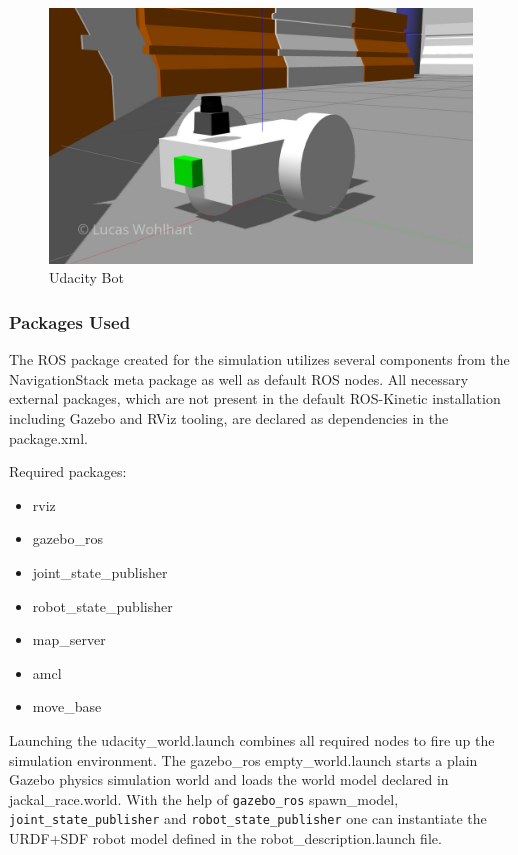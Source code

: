 \documentclass[10pt,journal,compsoc]{IEEEtran}
\begin{document}
\begin{figure}[thpb]
      \centering
      \includegraphics[width=\linewidth]{img/udacity_bot}
      \caption{Udacity Bot}
      \label{fig:udacity_bot}
\end{figure}

\subsubsection{Packages Used}

The ROS package created for the simulation utilizes several components from the NavigationStack meta package as well as default ROS nodes. 
All necessary external packages, which are not present in the default ROS-Kinetic installation including Gazebo and RViz tooling, are declared as dependencies in the package.xml. 

Required packages:
\begin{itemize}
 \item rviz
 \item gazebo\_ros
 \item joint\_state\_publisher
 \item robot\_state\_publisher
 \item map\_server \cite{ROSNavMapServer} 
 \item amcl \cite{ROSNavAMCL}
 \item move\_base \cite{ROSNavMoveBase}
\end{itemize}

Launching the udacity\_world.launch combines all required nodes to fire up the simulation environment.
The gazebo\_ros empty\_world.launch starts a plain Gazebo physics simulation world and loads the world model declared in jackal\_race.world.
With the help of \texttt{gazebo\_ros} spawn\_model, \texttt{joint\_state\_publisher} and \texttt{robot\_state\_publisher} one can instantiate the URDF+SDF robot model defined in the robot\_description.launch file.
\end{document}
